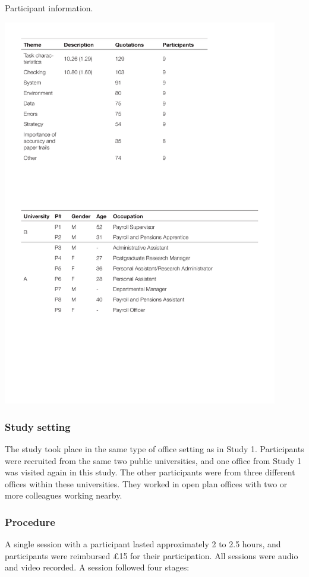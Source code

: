 \begin{table}
\caption[Study 2 participant information]{Participant information.}
\centering
\includegraphics[width=0.9\textwidth]{images/ch12/ch12_participants2.pdf}
\vspace{-3pt}
\label{tbl:ch12-part2}
\end{table}

\subsubsection{Study setting}
The study took place in the same type of office setting as in Study 1. Participants were recruited from the same two public universities, and one office from Study 1 was visited again in this study. The other participants were from three different offices within these universities. They worked in open plan offices with two or more colleagues working nearby. 

\subsubsection{Procedure}
A single session with a participant lasted approximately 2 to 2.5 hours, and participants were reimbursed \pounds 15 for their participation. All sessions were audio and video recorded. A session followed four stages:

